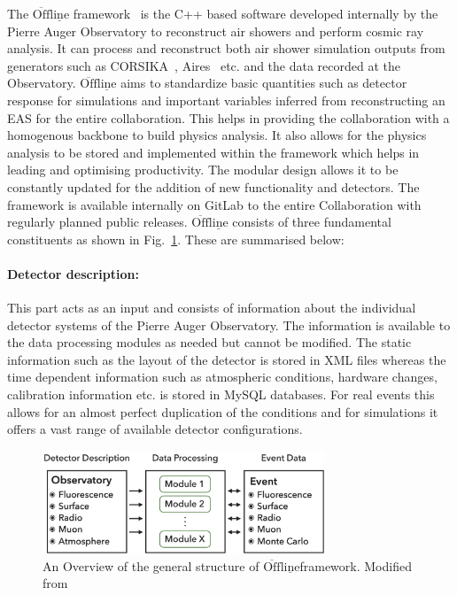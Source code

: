 The $\mathrm{\overline{Off} \underline{line}}$ framework~\cite{Argiro:2007qg,PierreAuger:2023cqe} is the C++ based software developed internally by the Pierre Auger Observatory to reconstruct air showers and perform cosmic ray analysis. It can process and reconstruct both air shower simulation outputs from generators such as CORSIKA~\cite{Heck:1998vt}, Aires~\cite{Sciutto:1999jh} etc. and the data recorded at the Observatory. $\mathrm{\overline{Off} \underline{line}}$ aims to standardize basic quantities such as detector response for simulations and important variables inferred from reconstructing an EAS for the entire collaboration. This helps in providing the collaboration with a homogenous backbone to build physics analysis. It also allows for the physics analysis to be stored and implemented within the framework which helps in leading and optimising productivity. The modular design allows it to be constantly updated for the addition of new functionality and detectors. The framework is available internally on GitLab to the entire Collaboration with regularly planned public releases. $\mathrm{\overline{Off} \underline{line}}$ consists of three fundamental constituents as shown in Fig.~\ref{fig:Offline_schematic}. These are summarised below:



\paragraph*{Detector description:}
This part acts as an input and consists of information about the individual detector systems of the Pierre Auger Observatory. The information is available to the data processing modules as needed but cannot be modified. The static information such as the layout of the detector is stored in XML files whereas the time dependent information such as atmospheric conditions, hardware changes, calibration information etc. is stored in MySQL databases. For real events this allows for an almost perfect duplication of the conditions and for simulations it offers a vast range of available detector configurations.  

\begin{figure}[t!]
  \centering
  \includegraphics[width=0.75\textwidth]{thesis_figures/Setup/Offline_schematic.png}
  \caption{An Overview of the general structure of $\mathrm{\overline{Off}\underline{line}}$framework. Modified from ~\cite{Argiro:2007qg} }
  \label{fig:Offline_schematic}
\end{figure}

